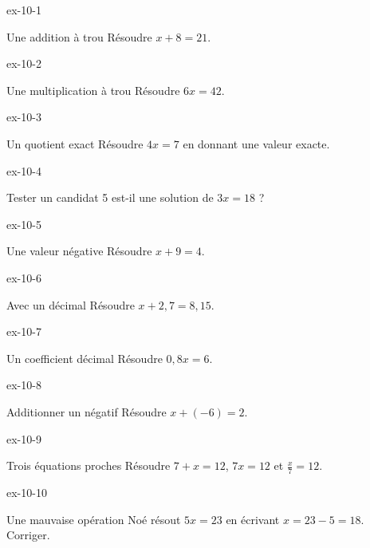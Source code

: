 \clearpage{}
\begin{blocLivre}{ex-10-1}\begin{exercice}[1]{Une addition à trou}
Résoudre $x+8=21$.
\end{exercice}\end{blocLivre}
\begin{blocLivre}{ex-10-2}\begin{exercice}[1]{Une multiplication à trou}
Résoudre $6x=42$.
\end{exercice}\end{blocLivre}
\begin{blocLivre}{ex-10-3}\begin{exercice}[1]{Un quotient exact}
Résoudre $4x=7$ en donnant une valeur exacte.
\end{exercice}\end{blocLivre}
\begin{blocLivre}{ex-10-4}\begin{exercice}[1]{Tester un candidat}
5 est-il une solution de $3x=18$ ?
\end{exercice}\end{blocLivre}
\begin{blocLivre}{ex-10-5}\begin{exercice}[1]{Une valeur négative}
Résoudre $x+9=4$.
\end{exercice}\end{blocLivre}

\begin{blocLivre}{ex-10-6}\begin{exercice}[2]{Avec un décimal}
Résoudre $x+2{,}7=8{,}15$.
\end{exercice}\end{blocLivre}
\begin{blocLivre}{ex-10-7}\begin{exercice}[2]{Un coefficient décimal}
Résoudre $0{,}8x=6$.
\end{exercice}\end{blocLivre}
\begin{blocLivre}{ex-10-8}\begin{exercice}[2]{Additionner un négatif}
Résoudre $x+(-6)=2$.
\end{exercice}\end{blocLivre}
\begin{blocLivre}{ex-10-9}\begin{exercice}[2]{Trois équations proches}
Résoudre $7+x=12$, $7x=12$ et $\frac x7=12$.
\end{exercice}\end{blocLivre}
\begin{blocLivre}{ex-10-10}\begin{exercice}[2]{Une mauvaise opération}
Noé résout $5x=23$ en écrivant $x=23-5=18$. Corriger.
\end{exercice}\end{blocLivre}

